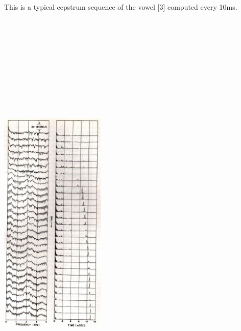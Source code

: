 \documentclass[12pt,a4paper,english]{article}
\begin{document}
\newpage
\addtolength{\textwidth}{4cm}
This is a typical cepstrum sequence of the vowel [3] computed every 10ms. \newline

\begin{minipage}[-100,0]{5cm}
\includegraphics[width=5cm,height=21cm]{vowel_cepstrum.jpg}
\end{minipage}
\end{document}
